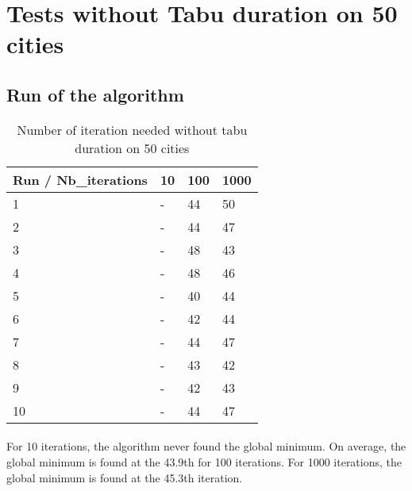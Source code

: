 \documentclass[12pt,oneside,a4paper]{article}
\begin{document}
\section{Tests without Tabu duration on 50 cities}
\subsection{Run of the algorithm}
\begin{table}[h]
    \centering
    \small
    \begin{tabular}{llll}
      \hline
      \multicolumn{1}{|l|}{\textbf{Run / Nb\_iterations}}& \multicolumn{1}{l|}{\textbf{10}} & \multicolumn{1}{l|}{\textbf{100}} & \multicolumn{1}{l|}{\textbf{1000}}\\ \hline
      \multicolumn{1}{|l|}{1} & \multicolumn{1}{l|}{-}  & \multicolumn{1}{l|}{44}  & \multicolumn{1}{l|}{50}  \\ \hline
      \multicolumn{1}{|l|}{2} & \multicolumn{1}{l|}{-}  & \multicolumn{1}{l|}{44}  & \multicolumn{1}{l|}{47}  \\ \hline         
      \multicolumn{1}{|l|}{3} & \multicolumn{1}{l|}{-}  & \multicolumn{1}{l|}{48}  & \multicolumn{1}{l|}{43}  \\ \hline
      \multicolumn{1}{|l|}{4} & \multicolumn{1}{l|}{-}  & \multicolumn{1}{l|}{48}  & \multicolumn{1}{l|}{46}  \\ \hline
      \multicolumn{1}{|l|}{5} & \multicolumn{1}{l|}{-}  & \multicolumn{1}{l|}{40}  & \multicolumn{1}{l|}{44}  \\ \hline
      \multicolumn{1}{|l|}{6} & \multicolumn{1}{l|}{-}  & \multicolumn{1}{l|}{42}  & \multicolumn{1}{l|}{44}  \\ \hline
      \multicolumn{1}{|l|}{7} & \multicolumn{1}{l|}{-}  & \multicolumn{1}{l|}{44}  & \multicolumn{1}{l|}{47}  \\ \hline
      \multicolumn{1}{|l|}{8} & \multicolumn{1}{l|}{-}  & \multicolumn{1}{l|}{43}  & \multicolumn{1}{l|}{42}  \\ \hline
      \multicolumn{1}{|l|}{9} & \multicolumn{1}{l|}{-}  & \multicolumn{1}{l|}{42}  & \multicolumn{1}{l|}{43}  \\ \hline
      \multicolumn{1}{|l|}{10} & \multicolumn{1}{l|}{-}  & \multicolumn{1}{l|}{44}  & \multicolumn{1}{l|}{47}  \\ \hline
    \end{tabular}
    \caption{Number of iteration needed without tabu duration on 50 cities}
  \end{table}
\paragraph{}
    For 10 iterations, the algorithm never found the global minimum. On average, the global minimum is found at the 43.9th
    for 100 iterations. For 1000 iterations, the global minimum is found at the 45.3th iteration.
\end{document}
